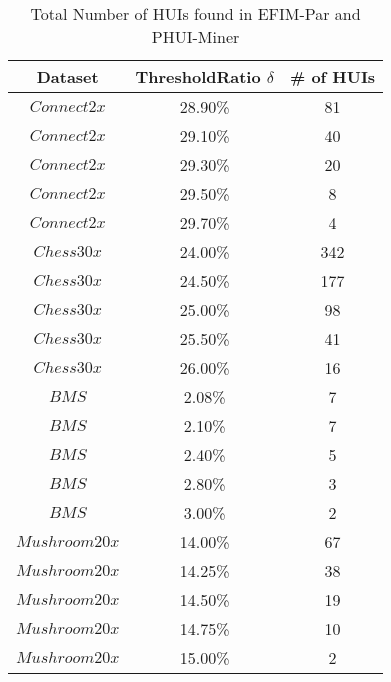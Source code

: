 \documentclass[11pt,openright]{report}
\begin{document}
\begin{table}
	\renewcommand{\arraystretch}{1.3}
	\caption{Total Number of HUIs found in EFIM-Par and PHUI-Miner}
	\label{table:result-huis-distributed}
	\centering
	\begin{tabular}{|c||c|c|}
		\hline
		\bfseries Dataset & \bfseries ThresholdRatio $\delta$ & \bfseries \# of HUIs\\
		\hline\hline
		$Connect2x$ & 28.90\% & 81\\ \hline
		$Connect2x$ & 29.10\% & 40\\ \hline
		$Connect2x$ & 29.30\% & 20\\ \hline
		$Connect2x$ & 29.50\% & 8\\ \hline
		$Connect2x$ & 29.70\% & 4\\ \hline \hline
		
		$Chess30x$ & 24.00\% & 342\\ \hline
		$Chess30x$ & 24.50\% & 177\\ \hline
		$Chess30x$ & 25.00\% & 98\\ \hline
		$Chess30x$ & 25.50\% & 41\\ \hline
		$Chess30x$ & 26.00\% & 16\\ \hline \hline
		
		$BMS$ & 2.08\% & 7\\ \hline
		$BMS$ & 2.10\% & 7\\ \hline
		$BMS$ & 2.40\% & 5\\ \hline
		$BMS$ & 2.80\% & 3\\ \hline
		$BMS$ & 3.00\% & 2\\ \hline
		
		$Mushroom20x$ & 14.00\% & 67\\ \hline
		$Mushroom20x$ & 14.25\% & 38\\ \hline
		$Mushroom20x$ & 14.50\% & 19\\ \hline
		$Mushroom20x$ & 14.75\% & 10\\ \hline
		$Mushroom20x$ & 15.00\% & 2\\ \hline
		
	\end{tabular}
\end{table}
\end{document}
